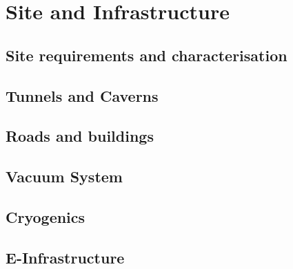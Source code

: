 
\chapter{Site and Infrastructure}
\label{chap:Site}

\section{Site requirements and characterisation}
\label{SiteReq}


\section{Tunnels and Caverns}
\label{Sec:TunnelsCaverns}


\section{Roads and buildings}
\label{Sec:RoadsBuildings}


\section{Vacuum System}
\label{Sec:Vacuum}


\section{Cryogenics}
\label{Sec:Cryogenics}



\section{E-Infrastructure}
\label{Sec:EInfrastructure}
